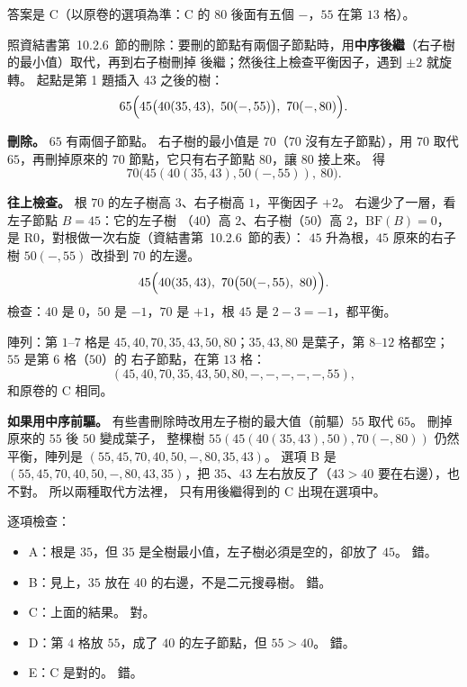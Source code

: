 \begin{pastsoln}
答案是 C（以原卷的選項為準：C 的 $80$ 後面有五個 $-$，$55$ 在第 $13$ 格）。

照資結書第~10.2.6~節的刪除：要刪的節點有兩個子節點時，用\textbf{中序後繼}（右子樹的最小值）取代，再到右子樹刪掉
後繼；然後往上檢查平衡因子，遇到 $\pm 2$ 就旋轉。 起點是第 1 題插入 $43$ 之後的樹：
\[
65\Bigl(45\bigl(40(35, 43),\ 50(-, 55)\bigr),\ 70(-, 80)\Bigr).
\]

\textbf{刪除。} $65$ 有兩個子節點。 右子樹的最小值是 $70$（$70$ 沒有左子節點），用 $70$ 取代 $65$，再刪掉原來的
$70$ 節點，它只有右子節點 $80$，讓 $80$ 接上來。 得
\[
70\bigl(45(40(35, 43), 50(-, 55)),\ 80\bigr).
\]

\textbf{往上檢查。} 根 $70$ 的左子樹高 $3$、右子樹高 $1$，平衡因子 $+2$。 右邊少了一層，看左子節點 $B = 45$：它的左子樹
（$40$）高 $2$、右子樹（$50$）高 $2$，$\mathrm{BF}(B) = 0$，是 R0，對根做一次右旋（資結書第~10.2.6~節的表）：
$45$ 升為根，$45$ 原來的右子樹 $50(-, 55)$ 改掛到 $70$ 的左邊。
\[
45\Bigl(40(35, 43),\ 70\bigl(50(-, 55),\ 80\bigr)\Bigr).
\]
檢查：$40$ 是 $0$，$50$ 是 $-1$，$70$ 是 $+1$，根 $45$ 是 $2 - 3 = -1$，都平衡。
\begin{center}
\end{center}
陣列：第 $1$--$7$ 格是 $45, 40, 70, 35, 43, 50, 80$；$35, 43, 80$ 是葉子，第 $8$--$12$ 格都空；$55$ 是第 $6$ 格（$50$）的
右子節點，在第 $13$ 格：
\[
(45, 40, 70, 35, 43, 50, 80, -, -, -, -, -, 55),
\]
和原卷的 C 相同。

\textbf{如果用中序前驅。} 有些書刪除時改用左子樹的最大值（前驅）$55$ 取代 $65$。 刪掉原來的 $55$ 後 $50$ 變成葉子，
整棵樹 $55(45(40(35, 43), 50), 70(-, 80))$ 仍然平衡，陣列是 $(55, 45, 70, 40, 50, -, 80, 35, 43)$。 選項 B 是
$(55, 45, 70, 40, 50, -, 80, 43, 35)$，把 $35$、$43$ 左右放反了（$43 > 40$ 要在右邊），也不對。 所以兩種取代方法裡，
只有用後繼得到的 C 出現在選項中。

逐項檢查：
\begin{itemize}
\item A：根是 $35$，但 $35$ 是全樹最小值，左子樹必須是空的，卻放了 $45$。 錯。
\item B：見上，$35$ 放在 $40$ 的右邊，不是二元搜尋樹。 錯。
\item C：上面的結果。 對。
\item D：第 $4$ 格放 $55$，成了 $40$ 的左子節點，但 $55 > 40$。 錯。
\item E：C 是對的。 錯。
\end{itemize}
\end{pastsoln}
